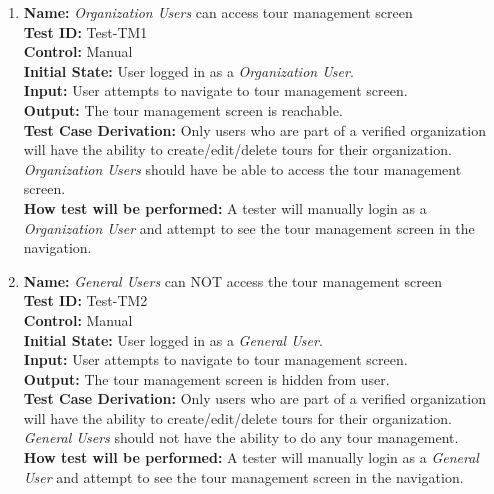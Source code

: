 \documentclass[12pt, titlepage]{article}
\begin{document}
\begin{enumerate}

    \item
    \textbf{Name:} \textit{Organization Users} can access tour management screen \label{itm:Test-TM1} \\
    \textbf{Test ID:} Test-TM1 \\
    \textbf{Control:} Manual \\
    \textbf{Initial State:} User logged in as a \textit{Organization User}. \\
    \textbf{Input:} User attempts to navigate to tour management screen. \\
    \textbf{Output:} The tour management screen is reachable. \\
    \textbf{Test Case Derivation:} Only users who are part of a verified organization will have the ability to create/edit/delete tours for their organization. \textit{Organization Users} should have be able to access the tour management screen. \\
    \textbf{How test will be performed:} A tester will manually login as a \textit{Organization User} and attempt to see the tour management screen in the navigation.

    \item
    \textbf{Name:} \textit{General Users} can NOT access the tour management screen \label{itm:Test-TM2} \\
    \textbf{Test ID:} Test-TM2 \\
    \textbf{Control:} Manual \\
    \textbf{Initial State:} User logged in as a \textit{General User}. \\
    \textbf{Input:} User attempts to navigate to tour management screen. \\
    \textbf{Output:} The tour management screen is hidden from user. \\
    \textbf{Test Case Derivation:} Only users who are part of a verified organization will have the ability to create/edit/delete tours for their organization. \textit{General Users} should not have the ability to do any tour management. \\
    \textbf{How test will be performed:} A tester will manually login as a \textit{General User} and attempt to see the tour management screen in the navigation.


\end{enumerate}
\end{document}
